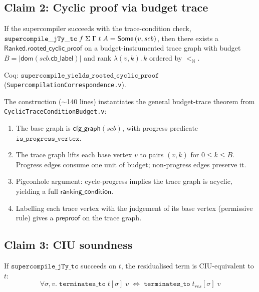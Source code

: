 \subsection{Claim 2: Cyclic proof via budget trace}

\begin{theorem}
\label{thm:mech-cyclic}
If the supercompiler succeeds with the trace-condition check,
$\mathtt{supercompile\_jTy\_tc}\;f\;\Sigma\;\Gamma\;t\;A = \mathsf{Some}\,(v,\mathit{scb})$,
then there exists a $\mathsf{Ranked.rooted\_cyclic\_proof}$ on a budget-instrumented trace graph with budget $B = |\mathsf{dom}(\mathit{scb}.\mathsf{cb\_label})|$ and rank $\lambda(v,k).\,k$ ordered by $<_\mathbb{N}$.
\end{theorem}

\noindent Coq: $\texttt{supercompile\_yields\_rooted\_cyclic\_proof}$ (\texttt{SupercompilationCorrespondence.v}).

The construction ($\sim$140 lines) instantiates the general budget-trace theorem from \texttt{CyclicTraceConditionBudget.v}:
\begin{enumerate}[leftmargin=*,nosep]
\item The base graph is $\mathsf{cfg\_graph}(\mathit{scb})$, with progress predicate $\texttt{is\_progress\_vertex}$.
\item The trace graph lifts each base vertex $v$ to pairs $(v,k)$ for $0 \le k \le B$.
Progress edges consume one unit of budget; non-progress edges preserve it.
\item Pigeonhole argument: cycle-progress implies the trace graph is acyclic, yielding a full $\mathsf{ranking\_condition}$.
\item Labelling each trace vertex with the judgement of its base vertex (permissive rule) gives a $\mathsf{preproof}$ on the trace graph.
\end{enumerate}

\subsection{Claim 3: CIU soundness}

\begin{theorem}
\label{thm:mech-ciu}
If $\mathtt{supercompile\_jTy\_tc}$ succeeds on $t$, the residualised term is CIU-equivalent to $t$:
\[
\forall \sigma, v.\; \mathtt{terminates\_to}\;t[\sigma]\;v \;\iff\; \mathtt{terminates\_to}\;t_{\mathit{res}}[\sigma]\;v
\]
\end{theorem}

